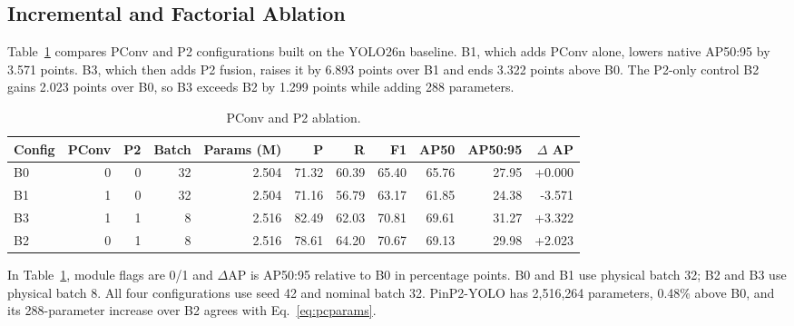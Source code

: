 \documentclass[lettersize,journal]{IEEEtran}
\begin{document}
\subsection{Incremental and Factorial Ablation}
Table~\ref{tab:ablation} compares PConv and P2 configurations built on the YOLO26n baseline. B1, which adds PConv alone, lowers native AP50:95 by 3.571 points. B3, which then adds P2 fusion, raises it by 6.893 points over B1 and ends 3.322 points above B0. The P2-only control B2 gains 2.023 points over B0, so B3 exceeds B2 by 1.299 points while adding 288 parameters.
\begin{table}[!t]
\caption{PConv and P2 ablation.}
\label{tab:ablation}
\centering\footnotesize
\setlength{\tabcolsep}{3pt}
\begin{tabular}{lrrrrrrrrrr}
\hline
Config & PConv & P2 & Batch & Params (M) & P & R & F1 & AP50 & AP50:95 & $\Delta$ AP\\
\hline
B0 & 0 & 0 & 32 & 2.504 & 71.32 & 60.39 & 65.40 & 65.76 & 27.95 & +0.000\\
B1 & 1 & 0 & 32 & 2.504 & 71.16 & 56.79 & 63.17 & 61.85 & 24.38 & -3.571\\
B3 & 1 & 1 & 8 & 2.516 & 82.49 & 62.03 & 70.81 & 69.61 & 31.27 & +3.322\\
B2 & 0 & 1 & 8 & 2.516 & 78.61 & 64.20 & 70.67 & 69.13 & 29.98 & +2.023\\
\hline
\end{tabular}
\end{table}

In Table~\ref{tab:ablation}, module flags are 0/1 and $\Delta$AP is AP50:95 relative to B0 in percentage points. B0 and B1 use physical batch 32; B2 and B3 use physical batch 8. All four configurations use seed 42 and nominal batch 32. PinP2-YOLO has 2,516,264 parameters, 0.48\% above B0, and its 288-parameter increase over B2 agrees with Eq.~\ref{eq:pcparams}.
\end{document}
